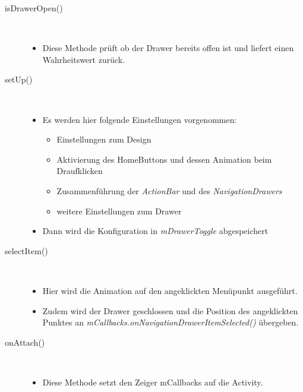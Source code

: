 \begin{description}
\item[isDrawerOpen()]~\par
\begin{itemize}
\item Diese Methode prüft ob der Drawer bereits offen ist und liefert einen Wahrheitswert zurück.
\end{itemize} 
\item[setUp()]~\par
\begin{itemize}
\item Es werden hier folgende Einstellungen vorgenommen:
\begin{itemize}
\item Einstellungen zum Design
\item Aktivierung des HomeButtons und dessen Animation beim Draufklicken
\item Zusammenführung der \textit{ActionBar} und des \textit{NavigationDrawers}
\item weitere Einstellungen zum Drawer
\end{itemize}
\item Dann wird die Konfiguration in \textit{mDrawerToggle} abgespeichert
\end{itemize}

\item[selectItem()]~\par
\begin{itemize}
\item Hier wird die Animation auf den angeklickten Menüpunkt ausgeführt.
\item Zudem wird der Drawer geschlossen und die Position des angeklickten Punktes an \textit{mCallbacks.onNavigationDrawerItemSelected()}  übergeben.
\end{itemize} 
\item[onAttach()]~\par
\begin{itemize}
\item Diese Methode setzt den Zeiger mCallbacks auf die Activity.
\end{itemize}
 

\end{description}
